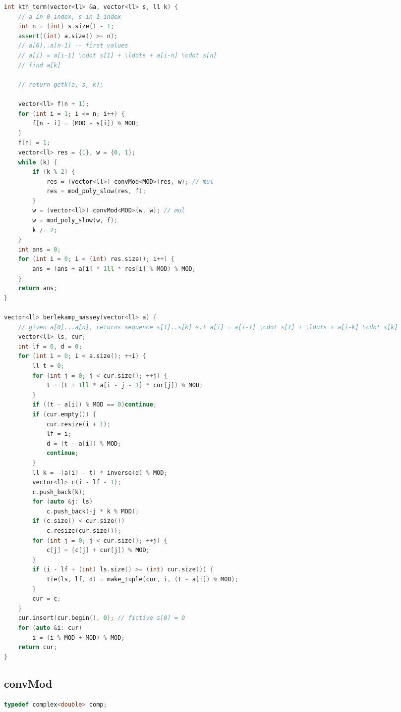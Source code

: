 \documentclass[9pt,a4paper,landscape,twosided]{extarticle}
\begin{document}
\begin{multicols*}{3}
\begin{lstlisting}[language=C++]
int kth_term(vector<ll> &a, vector<ll> s, ll k) {
    // a in 0-index, s in 1-index
    int n = (int) s.size() - 1;
    assert((int) a.size() >= n);
    // a[0]..a[n-1] -- first values
    // a[i] = a[i-1] \cdot s[1] + \ldots + a[i-n] \cdot s[n]
    // find a[k]

    // return getk(a, s, k);

    vector<ll> f(n + 1);
    for (int i = 1; i <= n; i++) {
        f[n - i] = (MOD - s[i]) % MOD;
    }
    f[n] = 1;
    vector<ll> res = {1}, w = {0, 1};
    while (k) {
        if (k % 2) {
            res = (vector<ll>) convMod<MOD>(res, w); // mul
            res = mod_poly_slow(res, f);
        }
        w = (vector<ll>) convMod<MOD>(w, w); // mul
        w = mod_poly_slow(w, f);
        k /= 2;
    }
    int ans = 0;
    for (int i = 0; i < (int) res.size(); i++) {
        ans = (ans + a[i] * 1ll * res[i] % MOD) % MOD;
    }
    return ans;
}

vector<ll> berlekamp_massey(vector<ll> a) {
    // given a[0]...a[n], returns sequence s[1]..s[k] s.t a[i] = a[i-1] \cdot s[1] + \ldots + a[i-k] \cdot s[k]
    vector<ll> ls, cur;
    int lf = 0, d = 0;
    for (int i = 0; i < a.size(); ++i) {
        ll t = 0;
        for (int j = 0; j < cur.size(); ++j) {
            t = (t + 1ll * a[i - j - 1] * cur[j]) % MOD;
        }
        if ((t - a[i]) % MOD == 0)continue;
        if (cur.empty()) {
            cur.resize(i + 1);
            lf = i;
            d = (t - a[i]) % MOD;
            continue;
        }
        ll k = -(a[i] - t) * inverse(d) % MOD;
        vector<ll> c(i - lf - 1);
        c.push_back(k);
        for (auto &j: ls)
            c.push_back(-j * k % MOD);
        if (c.size() < cur.size())
            c.resize(cur.size());
        for (int j = 0; j < cur.size(); ++j) {
            c[j] = (c[j] + cur[j]) % MOD;
        }
        if (i - lf + (int) ls.size() >= (int) cur.size()) {
            tie(ls, lf, d) = make_tuple(cur, i, (t - a[i]) % MOD);
        }
        cur = c;
    }
    cur.insert(cur.begin(), 0); // fictive s[0] = 0
    for (auto &i: cur)
        i = (i % MOD + MOD) % MOD;
    return cur;
}
\end{lstlisting}

\subsection{convMod}
\begin{lstlisting}[language=C++]
typedef complex<double> comp;


\end{lstlisting}
\end{multicols*}
\end{document}
